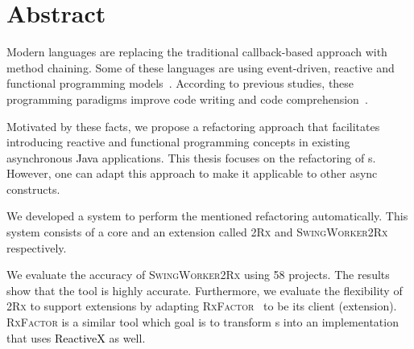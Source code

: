 \documentclass[type=bsc,accentcolor=tud9c]{tudthesis}
\newcommand{\framework}[1]{\textcolor{black}{#1}}
\newcommand{\toolcore}{\textsc{2Rx}}
\newcommand{\toolextension}{\textsc{SwingWorker2Rx}}
\begin{document}

\author{Grebiel José Ifill Brito}
\date{February 2017}

\makethesistitle

\chapter*{Abstract}
Modern languages are replacing the traditional callback-based approach with method chaining. Some of these languages are using event-driven, reactive and functional programming models~\cite{agera, reactiveX, paperFlapjax}. According to previous studies, these programming paradigms improve code writing and code comprehension~\cite{promises, paperReactiveComprehension}.

Motivated by these facts, we propose a refactoring approach that facilitates introducing reactive and functional programming concepts in existing asynchronous \framework{Java} applications. This thesis focuses on the refactoring of s. However, one can adapt this approach to make it applicable to other async constructs.

We developed a system to perform the mentioned refactoring automatically. This system consists of a core and an extension called \toolcore{} and \toolextension{} respectively.

We evaluate the accuracy of \toolextension{} using 58 projects. The results show that the tool is highly accurate. Furthermore, we evaluate the flexibility of \toolcore{} to support extensions by adapting \textsc{RxFactor}~\cite{thesisRxFactor} to be its client (extension). \textsc{RxFactor} is a similar tool which goal is to transform s into an implementation that uses \framework{ReactiveX} as well.

\tableofcontents
\listoffigures
\listoftables
\listoflistings
\end{document}

